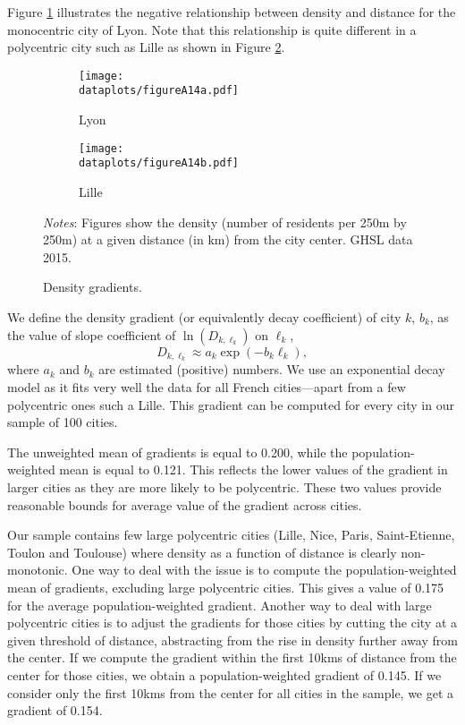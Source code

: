 \documentclass[11pt]{report}
\newcommand{\dataplots}{../output/data/plots}
\begin{document}
Figure \ref{A-fig:gradientlyon} illustrates the negative relationship between density and distance for the monocentric city of Lyon. Note that this relationship is quite different in a polycentric city such as Lille as shown in Figure \ref{A-fig:gradientlille}. 

\begin{figure}[h]
	\begin{subfigure}{0.5\textwidth}
		\texttt{[image: \\dataplots/figureA14a.pdf]}
		\caption{Lyon\label{A-fig:gradientlyon}}
	\end{subfigure}%
	\begin{subfigure}{0.5\textwidth}
		\texttt{[image: \\dataplots/figureA14b.pdf]}
		\caption{Lille\label{A-fig:gradientlille}}
	\end{subfigure}
	\caption{Density gradients.\label{A-fig:gradient}}
	{\footnotesize \textit{Notes}: Figures show the density (number of residents per 250m by 250m) at a given distance (in km) from the city center. GHSL data 2015.}
\end{figure}

We define the density gradient (or equivalently decay coefficient) of city $k$, $b_k$, as the value of slope coefficient of $\ln(D_{k,\ell_k})$ on $\ell_k$,	
\begin{equation}
D_{k,\ell_k}\approx a_k\exp(-b_k\ell_k), \label{A-eq:gradient}
\end{equation}
where $a_k$ and $b_k$ are estimated (positive) numbers. We use an exponential decay model as it fits very well the data for all French cities---apart from a few polycentric ones such a Lille. This gradient can be computed for every city in our sample of 100 cities. 

The unweighted mean of gradients is equal to 0.200, while the population-weighted mean is equal to 0.121. This reflects the lower values of the gradient in larger cities as they are more likely to be polycentric. These two values provide reasonable bounds for average value of the gradient across cities. 

Our sample contains few large polycentric cities (Lille, Nice, Paris, Saint-Etienne, Toulon and Toulouse) where density as a function of distance is clearly non-monotonic. One way to deal with the issue is to compute the population-weighted mean of gradients, excluding large polycentric cities. This gives a value of 0.175 for the average population-weighted gradient. Another way to deal with large polycentric cities is to adjust the gradients for those cities by cutting the city at a given threshold of distance, abstracting from the rise in density further away from the center. If we compute the gradient within the first 10kms of distance from the center for those cities, we obtain a population-weighted gradient of 0.145. If we consider only the first 10kms from the center for all cities in the sample, we get a gradient of 0.154. 
\end{document}
